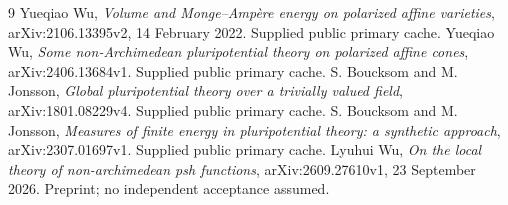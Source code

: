 \documentclass[11pt]{article}
\begin{document}
\begin{thebibliography}{9}
 Yueqiao Wu, \emph{Volume and Monge--Amp\`ere energy on polarized affine varieties}, arXiv:2106.13395v2, 14 February 2022. Supplied public primary cache.
 Yueqiao Wu, \emph{Some non-Archimedean pluripotential theory on polarized affine cones}, arXiv:2406.13684v1. Supplied public primary cache.
 S. Boucksom and M. Jonsson, \emph{Global pluripotential theory over a trivially valued field}, arXiv:1801.08229v4. Supplied public primary cache.
 S. Boucksom and M. Jonsson, \emph{Measures of finite energy in pluripotential theory: a synthetic approach}, arXiv:2307.01697v1. Supplied public primary cache.
 Lyuhui Wu, \emph{On the local theory of non-archimedean psh functions}, arXiv:2609.27610v1, 23 September 2026. Preprint; no independent acceptance assumed.
\end{thebibliography}
\end{document}
